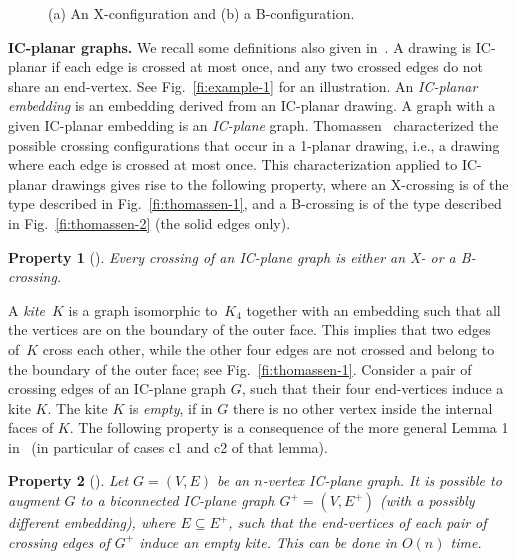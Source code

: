 \documentclass[a4paper]{article}
\newtheorem{property}{Property}
\begin{document}
\begin{figure}[t]
    \centering
    \hfil
  \caption{\small (a) An X-configuration and (b) a B-configuration.}
\end{figure}

{\bf IC-planar graphs.} We recall some definitions also given in~\cite{bdek+-rdicg-15}. A drawing is IC-planar if each edge is crossed at most once, and any two crossed edges do not share an end-vertex. See Fig.~\ref{fi:example-1} for an illustration. An \emph{IC-planar embedding} is an embedding derived from an IC-planar drawing. A graph with a given IC-planar embedding is an \emph{IC-plane} graph. Thomassen~\cite{t-rdg-JGT88} characterized the possible crossing configurations that occur in a 1-planar drawing, i.e., a drawing where each edge is crossed at most once. This characterization applied to IC-planar drawings gives rise to the following property, where an X-crossing is of the  type described in Fig.~\ref{fi:thomassen-1}, and a B-crossing is of the type described in Fig.~\ref{fi:thomassen-2} (the solid edges only). 

\begin{property}[\cite{bdek+-rdicg-15}]\label{pr:char-crossins}
  Every crossing of an IC-plane graph is either an X- or a B-crossing.
\end{property}
A \emph{kite}~$K$ is a graph isomorphic to~$K_4$ together with an embedding such that all the vertices are on the boundary of the outer face. This implies that two edges of~$K$ cross each other, while the other four edges are not crossed and  belong to the boundary of the outer face; see Fig.~\ref{fi:thomassen-1}. Consider a pair of crossing edges of an IC-plane graph $G$, such that their four end-vertices induce a kite $K$. The kite $K$ is \emph{empty}, if in $G$ there is no other vertex inside the internal faces of $K$. The following property is a consequence of the more general Lemma 1 in~\cite{bdek+-rdicg-15} (in particular of cases c1 and c2 of that lemma). 

\begin{property}[\cite{bdek+-rdicg-15}]\label{pr:augmentation}
Let $G=(V,E)$ be an $n$-vertex IC-plane graph. It is possible to augment $G$ to a biconnected IC-plane graph $G^+=(V,E^+)$ (with a possibly different embedding), where $E \subseteq E^+$, such that the end-vertices of each pair of crossing edges of $G^+$ induce an empty kite. This can be done in $O(n)$ time.
\end{property}
\end{document}
